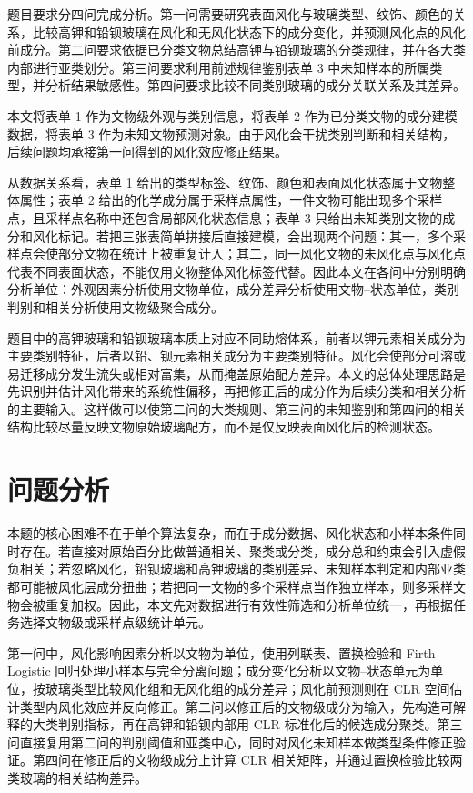 \documentclass[UTF8,zihao=-4,a4paper,fontset=fandol]{ctexart}
\begin{document}
题目要求分四问完成分析。第一问需要研究表面风化与玻璃类型、纹饰、颜色的关系，比较高钾和铅钡玻璃在风化和无风化状态下的成分变化，并预测风化点的风化前成分。第二问要求依据已分类文物总结高钾与铅钡玻璃的分类规律，并在各大类内部进行亚类划分。第三问要求利用前述规律鉴别表单 3 中未知样本的所属类型，并分析结果敏感性。第四问要求比较不同类别玻璃的成分关联关系及其差异。

本文将表单 1 作为文物级外观与类别信息，将表单 2 作为已分类文物的成分建模数据，将表单 3 作为未知文物预测对象。由于风化会干扰类别判断和相关结构，后续问题均承接第一问得到的风化效应修正结果。

从数据关系看，表单 1 给出的类型标签、纹饰、颜色和表面风化状态属于文物整体属性；表单 2 给出的化学成分属于采样点属性，一件文物可能出现多个采样点，且采样点名称中还包含局部风化状态信息；表单 3 只给出未知类别文物的成分和风化标记。若把三张表简单拼接后直接建模，会出现两个问题：其一，多个采样点会使部分文物在统计上被重复计入；其二，同一风化文物的未风化点与风化点代表不同表面状态，不能仅用文物整体风化标签代替。因此本文在各问中分别明确分析单位：外观因素分析使用文物单位，成分差异分析使用文物--状态单位，类别判别和相关分析使用文物级聚合成分。

题目中的高钾玻璃和铅钡玻璃本质上对应不同助熔体系，前者以钾元素相关成分为主要类别特征，后者以铅、钡元素相关成分为主要类别特征。风化会使部分可溶或易迁移成分发生流失或相对富集，从而掩盖原始配方差异。本文的总体处理思路是先识别并估计风化带来的系统性偏移，再把修正后的成分作为后续分类和相关分析的主要输入。这样做可以使第二问的大类规则、第三问的未知鉴别和第四问的相关结构比较尽量反映文物原始玻璃配方，而不是仅反映表面风化后的检测状态。

\section{问题分析}

本题的核心困难不在于单个算法复杂，而在于成分数据、风化状态和小样本条件同时存在。若直接对原始百分比做普通相关、聚类或分类，成分总和约束会引入虚假负相关；若忽略风化，铅钡玻璃和高钾玻璃的类别差异、未知样本判定和内部亚类都可能被风化层成分扭曲；若把同一文物的多个采样点当作独立样本，则多采样文物会被重复加权。因此，本文先对数据进行有效性筛选和分析单位统一，再根据任务选择文物级或采样点级统计单元。

第一问中，风化影响因素分析以文物为单位，使用列联表、置换检验和 Firth Logistic 回归处理小样本与完全分离问题；成分变化分析以文物--状态单元为单位，按玻璃类型比较风化组和无风化组的成分差异；风化前预测则在 CLR 空间估计类型内风化效应并反向修正。第二问以修正后的文物级成分为输入，先构造可解释的大类判别指标，再在高钾和铅钡内部用 CLR 标准化后的候选成分聚类。第三问直接复用第二问的判别阈值和亚类中心，同时对风化未知样本做类型条件修正验证。第四问在修正后的文物级成分上计算 CLR 相关矩阵，并通过置换检验比较两类玻璃的相关结构差异。
\end{document}
